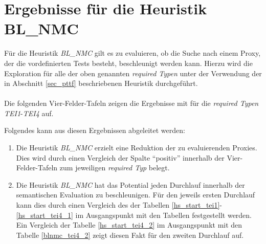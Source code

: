 \section{Ergebnisse für die Heuristik BL\_NMC}\label{sec_evalBLNMC}
Für die Heuristik \emph{BL\_NMC} gilt es zu evaluieren, ob die Suche nach einem Proxy, der die vordefinierten Tests besteht, beschleunigt werden kann. Hierzu wird die Exploration für alle der oben genannten \emph{required Typen} unter der Verwendung der in Abschnitt \ref{sec_pttf} beschriebenen Heuristik durchgeführt.
\\\\
Die folgenden Vier-Felder-Tafeln zeigen die Ergebnisse mit für die \emph{required Typen} \emph{TEI1}-\emph{TEI4} auf.
\begin{multicols}{3}

\end{multicols}
\begin{multicols}{2}
\end{multicols}
Folgendes kann aus diesen Ergebnissen abgeleitet werden:
\begin{enumerate}
\item Die Heuristik \emph{BL\_NMC} erzielt eine Reduktion der zu evaluierenden Proxies. Dies wird durch einen Vergleich der Spalte ``positiv'' innerhalb der Vier-Felder-Tafeln zum jeweiligen \emph{required Typ} belegt.

\item Die Heuristik \emph{BL\_NMC} hat das Potential jeden Durchlauf innerhalb der semantischen Evaluation zu beschleunigen. Für den jeweils ersten Durchlauf kann dies durch einen Vergleich des der Tabellen \ref{hs_start_tei1}-\ref{hs_start_tei4_1} im Ausgangspunkt mit den Tabellen festgestellt werden. Ein Vergleich der Tabelle \ref{hs_start_tei4_2} im Ausgangspunkt mit den Tabelle \ref{blnmc_tei4_2} zeigt diesen Fakt für den zweiten Durchlauf auf.
\end{enumerate}
